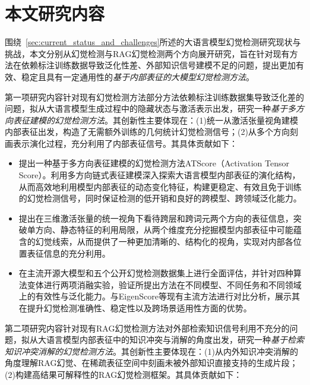 \section{本文研究内容}\label{sec:research_content}

围绕~\ref{sec:current_status_and_challenges}所述的大语言模型幻觉检测研究现状与挑战，本文分别从幻觉检测与RAG幻觉检测两个方向展开研究，旨在针对现有方法在依赖标注训练数据导致泛化性差、外部知识信号建模不足的问题，提出更加有效、稳定且具有一定通用性的\emph{基于内部表征的大模型幻觉检测方法}。

第一项研究内容针对现有幻觉检测方法部分方法依赖标注训练数据集导致泛化差的问题，拟从大语言模型生成过程中的隐藏状态与激活表示出发，研究一种\emph{基于多方向表征建模的幻觉检测方法}。其创新性主要体现在：(1)统一从激活张量视角建模内部表征出发，构造了无需额外训练的几何统计幻觉检测信号；(2)从多个方向刻画表示演化过程，充分利用了内部表征信号。其具体贡献如下：

\begin{itemize}
    \item 提出一种基于多方向表征建模的幻觉检测方法ATScore（Activation Tensor Score）。利用多方向链式表征建模深入探索大语言模型内部表征的演化结构，从而高效地利用模型内部表征的动态变化特征，构建更稳定、有效且免于训练的幻觉检测信号，同时保证检测的低开销和良好的跨模型、跨领域泛化能力。
    \item 提出在三维激活张量的统一视角下看待跨层和跨词元两个方向的表征信息，突破单方向、静态特征的利用局限，从两个维度充分挖掘模型内部表征中可能蕴含的幻觉线索，从而提供了一种更加清晰的、结构化的视角，实现对内部各位置表征信息的充分利用。
    \item 在主流开源大模型和五个公开幻觉检测数据集上进行全面评估，并针对四种算法变体进行两项消融实验，验证所提出方法在不同模型、不同任务和不同领域上的有效性与泛化能力。与EigenScore等现有主流方法进行对比分析，展示其在提升幻觉检测准确性、稳定性以及跨场景适用性方面的优势。
\end{itemize}

第二项研究内容针对现有RAG幻觉检测方法对外部检索知识信号利用不充分的问题，拟从大语言模型内部表征中的知识冲突与消解的角度出发，研究一种\emph{基于检索知识冲突消解的幻觉检测方法}。其创新性主要体现在：(1)从内外知识冲突消解的角度理解RAG幻觉、在稀疏表征空间中刻画未被外部知识直接支持的生成片段；(2)构建高结果可解释性的RAG幻觉检测框架。其具体贡献如下：

